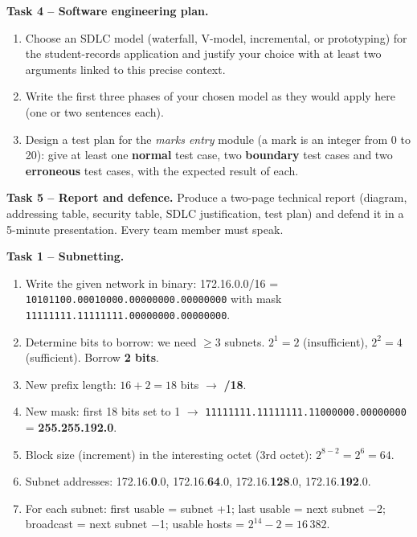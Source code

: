\documentclass[11pt]{article}
\newcounter{popsec}
\newcounter{popsub}
\newcommand{\courssub}[1]{%
  \stepcounter{popsub}%
  \par\vspace{9pt}\noindent{\popxbold\fontsize{11.5}{13}\selectfont\color{popink}{\color{poporange}\thepopsec.\thepopsub}\hspace{6pt}#1}\par\nopagebreak\vspace{4pt}
}
\begin{document}
\textbf{Task 4 -- Software engineering plan.}
\begin{enumerate}
\item Choose an SDLC model (waterfall, V-model, incremental, or prototyping) for the student-records application and justify your choice with at least two arguments linked to this precise context.
\item Write the first three phases of your chosen model as they would apply here (one or two sentences each).
\item Design a test plan for the \emph{marks entry} module (a mark is an integer from 0 to 20): give at least one \textbf{normal} test case, two \textbf{boundary} test cases and two \textbf{erroneous} test cases, with the expected result of each.
\end{enumerate}

\textbf{Task 5 -- Report and defence.}
Produce a two-page technical report (diagram, addressing table, security table, SDLC justification, test plan) and defend it in a 5-minute presentation. Every team member must speak.

\courssub{Model answer}

\textbf{Task 1 -- Subnetting.}

\begin{methode}
\begin{enumerate}
\item Write the given network in binary: 172.16.0.0/16 = \texttt{10101100.00010000.00000000.00000000} with mask \texttt{11111111.11111111.00000000.00000000}.
\item Determine bits to borrow: we need $\ge 3$ subnets. $2^1=2$ (insufficient), $2^2=4$ (sufficient). Borrow \textbf{2 bits}.
\item New prefix length: $16+2 = 18$ bits $\rightarrow$ \textbf{/18}.
\item New mask: first 18 bits set to 1 $\rightarrow$ \texttt{11111111.11111111.11000000.00000000} = \textbf{255.255.192.0}.
\item Block size (increment) in the interesting octet (3rd octet): $2^{8-2}=2^6=64$.
\item Subnet addresses: 172.16.\textbf{0}.0, 172.16.\textbf{64}.0, 172.16.\textbf{128}.0, 172.16.\textbf{192}.0.
\item For each subnet: first usable = subnet +1; last usable = next subnet $-$2; broadcast = next subnet $-$1; usable hosts = $2^{14}-2 = 16\,382$.
\end{enumerate}
\end{methode}
\end{document}
